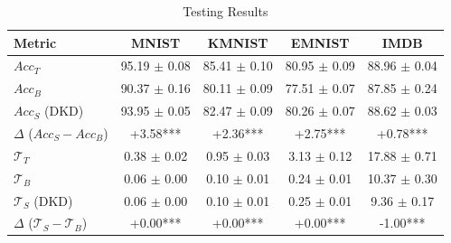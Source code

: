 \begin{table}
\caption{Testing Results}
\label{tab:combined-test-dkd}
\begin{tabular}{|l|c|c|c|c|}
\hline
Metric & MNIST & KMNIST & EMNIST & IMDB \\
\hline
$Acc_T$ & 95.19 $\pm$ 0.08 & 85.41 $\pm$ 0.10 & 80.95 $\pm$ 0.09 & 88.96 $\pm$ 0.04 \\
\hline
$Acc_B$ & 90.37 $\pm$ 0.16 & 80.11 $\pm$ 0.09 & 77.51 $\pm$ 0.07 & 87.85 $\pm$ 0.24 \\
\hline
$Acc_S$ (DKD) & 93.95 $\pm$ 0.05 & 82.47 $\pm$ 0.09 & 80.26 $\pm$ 0.07 & 88.62 $\pm$ 0.03 \\
\hline
$\Delta$ ($Acc_S-Acc_B$) & +3.58*** & +2.36*** & +2.75*** & +0.78*** \\
\hline
\hline
$\mathcal{T}_T$ & 0.38 $\pm$ 0.02 & 0.95 $\pm$ 0.03 & 3.13 $\pm$ 0.12 & 17.88 $\pm$ 0.71 \\
\hline
$\mathcal{T}_B$ & 0.06 $\pm$ 0.00 & 0.10 $\pm$ 0.01 & 0.24 $\pm$ 0.01 & 10.37 $\pm$ 0.30 \\
\hline
$\mathcal{T}_S$ (DKD)& 0.06 $\pm$ 0.00 & 0.10 $\pm$ 0.01 & 0.25 $\pm$ 0.01 & 9.36 $\pm$ 0.17 \\
\hline
$\Delta$ ($\mathcal{T}_S-\mathcal{T}_B$) & +0.00*** & +0.00*** & +0.00*** & -1.00*** \\
\hline
\end{tabular}
\end{table}
